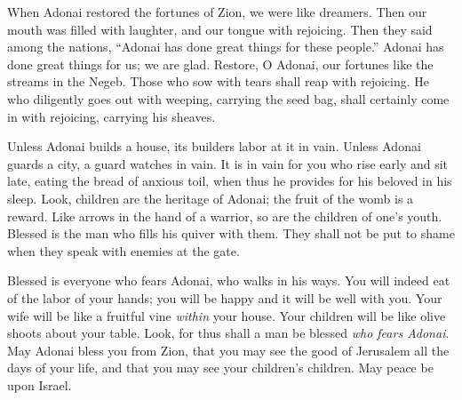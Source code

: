\begin{biblechapter} %
 When Adonai restored the fortunes of Zion, 
we were like dreamers.
\verse Then our mouth was filled with laughter, 
and our tongue with rejoicing. 
Then they said among the nations, 
“Adonai has done great things for these people.”
\verse Adonai has done great things for us; 
we are glad.
\verse Restore, O Adonai, our fortunes 
like the streams in the Negeb.
\verse Those who sow with tears 
shall reap with rejoicing.
\verse He who diligently goes out with weeping, 
carrying the seed bag, 
shall certainly come in with rejoicing, 
carrying his sheaves.
\end{biblechapter}

\begin{biblechapter} %
 Unless Adonai builds a house, 
its builders labor at it in vain. 
Unless Adonai guards a city, 
a guard watches in vain.
\verse It is in vain for you who rise early and sit late, 
eating the bread of anxious toil, 
when thus he provides for his beloved in his sleep.
\verse Look, children are the heritage of Adonai; 
the fruit of the womb is a reward.
\verse Like arrows in the hand of a warrior, 
so are the children of one’s youth.
\verse Blessed is the man who fills his quiver with them. 
They shall not be put to shame 
when they speak with enemies at the gate.
\end{biblechapter}

\begin{biblechapter} %
 Blessed is everyone who fears Adonai, 
who walks in his ways.
\verse You will indeed eat of the labor of your hands; 
you will be happy and it will be well with you.
\verse Your wife will be like a fruitful vine 
\textit{within} your house. 
Your children will be like olive shoots 
about your table.
\verse Look, for thus shall a man be blessed 
\textit{who fears Adonai}.
\verse May Adonai bless you from Zion, 
that you may see the good of Jerusalem 
all the days of your life,
\verse and that you may see your children’s children. 
May peace be upon Israel.
\end{biblechapter}

